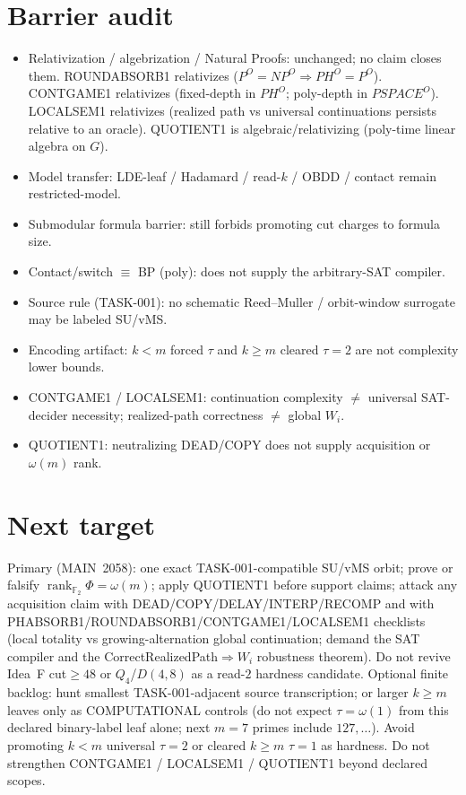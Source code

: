 \documentclass[11pt]{article}
\begin{document}
\section*{Barrier audit}
\begin{itemize}
\item Relativization / algebrization / Natural Proofs: unchanged; no claim closes them.
  ROUNDABSORB1 relativizes ($P^O{=}NP^O\Rightarrow PH^O{=}P^O$).
  CONTGAME1 relativizes (fixed-depth in $PH^O$; poly-depth in $PSPACE^O$).
  LOCALSEM1 relativizes (realized path vs universal continuations persists relative to an oracle).
  QUOTIENT1 is algebraic/relativizing (poly-time linear algebra on $G$).
\item Model transfer: LDE-leaf / Hadamard / read-$k$ / OBDD / contact remain restricted-model.
\item Submodular formula barrier: still forbids promoting cut charges to formula size.
\item Contact/switch $\equiv$ BP (poly): does not supply the arbitrary-SAT compiler.
\item Source rule (TASK-001): no schematic Reed--Muller / orbit-window surrogate may be labeled SU/vMS.
\item Encoding artifact: $k{<}m$ forced $\tau$ and $k{\ge}m$ cleared $\tau{=}2$ are not complexity lower bounds.
\item CONTGAME1 / LOCALSEM1: continuation complexity $\neq$ universal SAT-decider necessity;
  realized-path correctness $\neq$ global $W_i$.
\item QUOTIENT1: neutralizing DEAD/COPY does not supply acquisition or $\omega(m)$ rank.
\end{itemize}

\section*{Next target}
Primary (MAIN~2058): one exact TASK-001-compatible SU/vMS orbit; prove or falsify
$\operatorname{rank}_{\mathbb F_2}\Phi=\omega(m)$; apply QUOTIENT1 before support claims;
attack any acquisition claim with
DEAD/COPY/DELAY/INTERP/RECOMP and with PHABSORB1/ROUNDABSORB1/CONTGAME1/LOCALSEM1 checklists
(local totality vs growing-alternation global continuation; demand the SAT compiler and the
CorrectRealizedPath$\Rightarrow W_i$ robustness theorem).
Do not revive Idea~F cut$\ge48$ or $Q_4$/$D(4,8)$ as a read-$2$ hardness candidate.
Optional finite backlog: hunt smallest TASK-001-adjacent source transcription;
or larger $k{\ge}m$ leaves only as COMPUTATIONAL controls (do not expect $\tau=\omega(1)$
from this declared binary-label leaf alone; next $m{=}7$ primes include $127,\ldots$).
Avoid promoting $k{<}m$ universal $\tau{=}2$ or cleared $k{\ge}m$ $\tau{=}1$ as hardness.
Do not strengthen CONTGAME1 / LOCALSEM1 / QUOTIENT1 beyond declared scopes.
\end{document}
